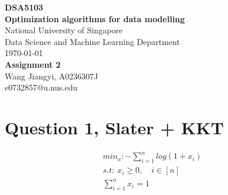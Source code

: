 \documentclass{article}
\begin{document}
\begin{titlepage}
	\begin{center}
		\vspace*{1cm}
		\Large{\textbf{DSA5103}}\\
		\Large{\textbf{Optimization algorithms for data modelling}}\\
		\vspace{1cm}
		\small
		National University of Singapore\\
		Data Science and Machine Learning Department\\
		\today \\
		\vfill
		\LARGE{\textbf{Assignment 2}}\\[5mm]
		\vfill
		\small
		Wang Jiangyi, A0236307J\\
		e0732857@u.nus.edu
	\end{center}
\end{titlepage}
\section{Question 1, Slater + KKT}
\begin{equation}
	\label{eq1}
	\begin{split}
		min_x:-\sum_{i=1}^{n} log(1+x_i)
		\\ s.t:\ x_i \ge 0, \quad i\in [n] \quad
		\\ \sum_{i=1}^n x_i = 1 \quad \quad \quad
	\end{split}
\end{equation}
\end{document}
